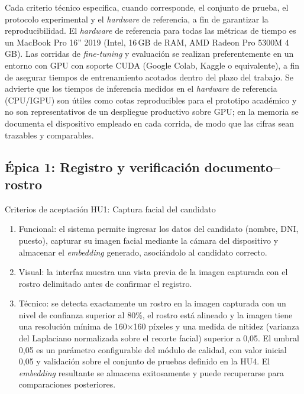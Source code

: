 \documentclass[
  11pt, %
]{charter}
\begin{document}
Cada criterio técnico especifica, cuando corresponde, el conjunto de prueba, el protocolo experimental y el \textit{hardware} de referencia, a fin de garantizar la reproducibilidad. El \textit{hardware} de referencia para todas las métricas de tiempo es un MacBook Pro 16'' 2019 (Intel, 16\,GB de RAM, AMD Radeon Pro 5300M 4\,GB). Las corridas de \textit{fine-tuning} y evaluación se realizan preferentemente en un entorno con GPU con soporte CUDA (Google Colab, Kaggle o equivalente), a fin de asegurar tiempos de entrenamiento acotados dentro del plazo del trabajo. Se advierte que los tiempos de inferencia medidos en el \textit{hardware} de referencia (CPU/IGPU) son útiles como cotas reproducibles para el prototipo académico y no son representativos de un despliegue productivo sobre GPU; en la memoria se documenta el dispositivo empleado en cada corrida, de modo que las cifras sean trazables y comparables.

\subsection{Épica 1: Registro y verificación documento--rostro}

Criterios de aceptación HU1: Captura facial del candidato
\begin{enumerate}
  \item Funcional: el sistema permite ingresar los datos del candidato (nombre, DNI, puesto), capturar su imagen facial mediante la cámara del dispositivo y almacenar el \textit{embedding} generado, asociándolo al candidato correcto.
  \item Visual: la interfaz muestra una vista previa de la imagen capturada con el rostro delimitado antes de confirmar el registro.
  \item Técnico: se detecta exactamente un rostro en la imagen capturada con un nivel de confianza superior al 80\%, el rostro está alineado y la imagen tiene una resolución mínima de 160$\times$160 píxeles y una medida de nitidez (varianza del Laplaciano normalizada sobre el recorte facial) superior a 0{,}05. El umbral 0{,}05 es un parámetro configurable del módulo de calidad, con valor inicial 0{,}05 y validación sobre el conjunto de pruebas definido en la HU4. El \textit{embedding} resultante se almacena exitosamente y puede recuperarse para comparaciones posteriores.
\end{enumerate}
\end{document}
